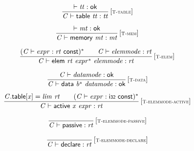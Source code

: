 $$
\begin{array}{@{}c@{}}\displaystyle
\frac{
{ \vdash }\;{\mathit{tt}} : \mathsf{ok}
}{
{\mathit{C}} \vdash \mathsf{table}~{\mathit{tt}} : {\mathit{tt}}
} \, {[\textsc{\scriptsize T{-}table}]}
\qquad
\end{array}
$$

$$
\begin{array}{@{}c@{}}\displaystyle
\frac{
{ \vdash }\;{\mathit{mt}} : \mathsf{ok}
}{
{\mathit{C}} \vdash \mathsf{memory}~{\mathit{mt}} : {\mathit{mt}}
} \, {[\textsc{\scriptsize T{-}mem}]}
\qquad
\end{array}
$$

$$
\begin{array}{@{}c@{}}\displaystyle
\frac{
({\mathit{C}} \vdash {\mathit{expr}} : {\mathit{rt}}~\mathsf{const})^\ast
 \qquad
{\mathit{C}} \vdash {\mathit{elemmode}} : {\mathit{rt}}
}{
{\mathit{C}} \vdash \mathsf{elem}~{\mathit{rt}}~{{\mathit{expr}}^\ast}~{\mathit{elemmode}} : {\mathit{rt}}
} \, {[\textsc{\scriptsize T{-}elem}]}
\qquad
\end{array}
$$

$$
\begin{array}{@{}c@{}}\displaystyle
\frac{
{\mathit{C}} \vdash {\mathit{datamode}} : \mathsf{ok}
}{
{\mathit{C}} \vdash \mathsf{data}~{{\mathit{b}}^\ast}~{\mathit{datamode}} : \mathsf{ok}
} \, {[\textsc{\scriptsize T{-}data}]}
\qquad
\end{array}
$$

$$
\begin{array}{@{}c@{}}\displaystyle
\frac{
{\mathit{C}}.\mathsf{table}{}[{\mathit{x}}] = {\mathit{lim}}~{\mathit{rt}}
 \qquad
({\mathit{C}} \vdash {\mathit{expr}} : \mathsf{i{\scriptstyle32}}~\mathsf{const})^\ast
}{
{\mathit{C}} \vdash \mathsf{active}~{\mathit{x}}~{\mathit{expr}} : {\mathit{rt}}
} \, {[\textsc{\scriptsize T{-}elemmode{-}active}]}
\qquad
\end{array}
$$

$$
\begin{array}{@{}c@{}}\displaystyle
\frac{
}{
{\mathit{C}} \vdash \mathsf{passive} : {\mathit{rt}}
} \, {[\textsc{\scriptsize T{-}elemmode{-}passive}]}
\qquad
\end{array}
$$

$$
\begin{array}{@{}c@{}}\displaystyle
\frac{
}{
{\mathit{C}} \vdash \mathsf{declare} : {\mathit{rt}}
} \, {[\textsc{\scriptsize T{-}elemmode{-}declare}]}
\qquad
\end{array}
$$

